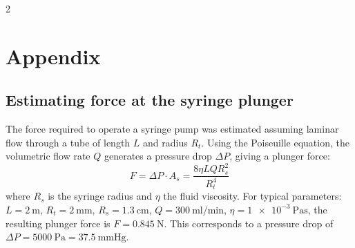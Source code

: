\documentclass[10pt, a4paper]{article}
\begin{document}

\newpage
\begingroup
\renewcommand{\bibfont}{\footnotesize}
\begin{multicols}{2}
    \printbibliography
\end{multicols}
\endgroup

\newpage
\appendix
\section{Appendix}
\subsection{Estimating force at the syringe plunger}
The force required to operate a syringe pump was estimated assuming laminar flow through a tube of length $L$ and radius $R_t$. Using the Poiseuille equation, the volumetric flow rate $Q$ generates a pressure drop $\Delta P$, giving a plunger force:
\begin{equation*}
    F = \Delta P \cdot A_s = \frac{8 \eta L Q R_s^2}{R_t^4}
\end{equation*}
where $R_s$ is the syringe radius and $\eta$ the fluid viscosity. For typical parameters: $L = \SI{2}{\metre}$, $R_t = \SI{2}{\milli\metre}$, $R_s = \SI{1.3}{\centi\metre}$, $Q = \SI{300}{\milli\litre\per\minute}$, $\eta = \SI{1e-3}{\pascal\second}$, the resulting plunger force is $F = \SI{0.845}{\newton}$. This corresponds to a pressure drop of $\Delta P = \SI{5000}{\pascal} = \SI{37.5}{\mmHg}$.
\end{document}
